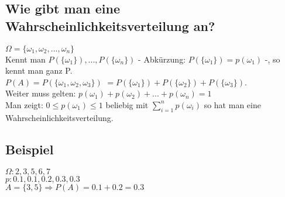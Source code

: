 \subsection{Wie gibt man eine Wahrscheinlichkeitsverteilung an?}
$\Omega = \{ \omega_1, \omega_2, ..., \omega_n \} $\\
Kennt man $ P(\{\omega_1\}), ..., P(\{\omega_n\}) $ - Abkürzung: $ P(\{\omega_1\}) = p(\omega_1) $ -, so kennt man ganz P. \\
$ P(A) = P(\{ \omega_1, \omega_2, \omega_3 \}) $ $= P(\{\omega_1\}) + P(\{\omega_2\}) + P(\{\omega_3\})$.\\
Weiter muss gelten: $ p(\omega_1) + p(\omega_2) + ... + p(\omega_n) = 1 $\\
Man zeigt: $ 0\leq p(\omega_1) \leq 1 $ beliebig mit $ \sum_{i=1}^{n} p(\omega_i) $ so hat man eine Wahrscheinlichkeitsverteilung. 

\subsection{Beispiel}
$ \Omega: 2,3,5,6,7 $\\
$ p: 0.1, 0.1, 0.2, 0.3, 0.3 $\\
$ A = \{ 3,5 \} \Rightarrow P(A) = 0.1 + 0.2 = 0.3 $

